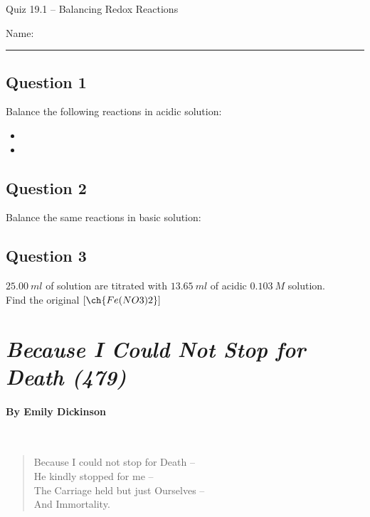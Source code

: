 \documentclass[11pt, letterpaper]{memoir}
\begin{document}
	\begin{center}
		{\large	Quiz 19.1 -- Balancing Redox Reactions}
	\end{center}
	{\large Name: \rule[-1mm]{4in}{.1pt} 

\subsection*{Question 1}
Balance the following reactions in acidic solution:

\begin{itemize}
	\item {}
	
	\vspace{4em}
	\item {}
\end{itemize}

\vspace{4em}
\subsection*{Question 2}
Balance the same reactions in basic solution:

\vspace{10em}
\subsection*{Question 3}
$25.00~ml$ of  solution are titrated with $13.65~ml$ of acidic $0.103~M$  solution.\\Find the original $\left[\ch{Fe(NO3)2}\right]$

	\newpage
	\pagestyle{empty}
	\addtocounter{page}{-1}
\section*{\emph{Because I Could Not Stop for Death (479)}}
\paragraph{By Emily Dickinson}~
\begin{verse}
	Because I could not stop for Death –\\
	He kindly stopped for me –\\
	The Carriage held but just Ourselves –\\
	And Immortality.
	

\end{verse}}
\end{document}
